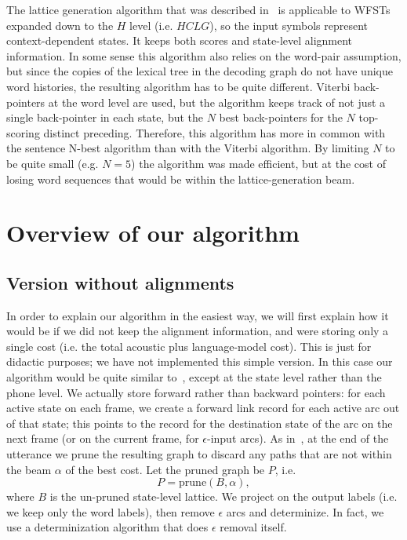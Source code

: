 \documentclass{article}
\def\HCLG{{\mathit{HCLG}}}
\begin{document}
The lattice generation algorithm that was described in~\cite{saon2005anatomy}
is applicable to WFSTs expanded down to the $H$ level (i.e. $\HCLG$),
so the input symbols represent context-dependent states.  It keeps both scores and 
state-level alignment information.  In some sense this algorithm also relies
on the word-pair assumption, but since the copies of the lexical tree in the decoding
graph do not have unique word histories, the resulting algorithm has to be quite
different.  Viterbi back-pointers at the word level are used, but the algorithm keeps track
of not just a single back-pointer in each state, but the $N$ best back-pointers for the $N$ top-scoring distinct
preceding.  Therefore, this algorithm has more in common with the sentence N-best
algorithm than with the Viterbi algorithm.  By limiting $N$ to be quite small (e.g. $N{=}5$)
the algorithm was made efficient, but at the cost of losing word sequences
that would be within the lattice-generation beam.

\section{Overview of our algorithm}
\label{sec:overview}

\subsection{Version without alignments}

In order to explain our algorithm in the easiest way, we will first explain how it would
be if we did not keep the alignment information, and were storing only a single cost
(i.e. the total acoustic plus language-model cost).  This is just for didactic purposes;
we have not implemented this simple version.
In this case our algorithm would be quite similar
to~\cite{efficient_general}, except at the state level rather than the phone level.
We actually store forward rather than backward pointers: for each active state on each
frame, we create a forward link record for each active arc out of that state; this points
to the record for the destination state of the arc on the next frame (or on 
the current frame, for $\epsilon$-input
arcs).   As in~\cite{efficient_general}, at the end of the utterance
we prune the resulting graph to discard any paths that are not within the beam $\alpha$ of the best cost. 
Let the pruned graph be $P$, i.e.
\begin{equation}
  P = \mathrm{prune}(B, \alpha),
\end{equation}
where $B$ is the un-pruned state-level lattice.
We project on the output labels (i.e. we keep only the word labels), then remove $\epsilon$
arcs and determinize.  In fact, we use a determinization algorithm that does $\epsilon$
removal itself.
\end{document}
